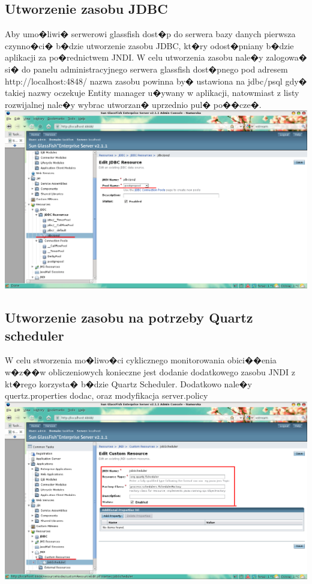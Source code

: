 \documentclass{article}
\begin{document}
\subsection{Utworzenie zasobu JDBC}
Aby umo�liwi� serwerowi glassfish dost�p do serwera bazy danych pierwsza czynno�ci� b�dzie utworzenie zasobu JDBC, kt�ry odost�pniany 
b�dzie aplikacji za po�rednictwem JNDI. W celu utworzenia zasobu nale�y zalogowa� si� do panelu administracyjnego serwera glassfish
dost�pnego pod adresem http://localhost:4848/ nazwa zasobu powinna by� ustawiona na jdbc/psql gdy� takiej nazwy oczekuje Entity manager u�ywany w 
aplikacji, natowmiast z listy rozwijalnej nale�y wybrac utworzan� uprzednio pul� po��cze�.
\newline
\newline
\includegraphics[scale=0.4]{img/admin01.png}
\newline
\newline
\subsection{Utworzenie zasobu na potrzeby Quartz scheduler}
W celu stworzenia mo�liwo�ci cyklicznego monitorowania obici��enia w�z��w obliczeniowych konieczne jest dodanie dodatkowego zasobu JNDI z kt�rego
korzysta� b�dzie Quartz Scheduler.
Dodatkowo nale�y quertz.properties dodac, oraz modyfikacja server.policy
\newline
\newline
\includegraphics[scale=0.4]{img/admin02.png}
\newline
\newline
\end{document}
